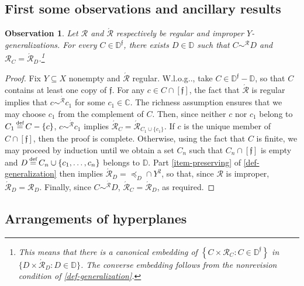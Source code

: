 \documentclass[ecta,nameyear,draft]{econsocart}
\makeatletter
\newcommand{\bs}{-}%
\newcommand{\mc}{\mathcal}
\newcommand\defeq{\mathrel{\overset{\makebox[0pt]{\mbox{\normalfont\tiny def}}}{=}}}%
\newcommand{\novel}{\mathfrak f}
\newcommand{\preceqb}{\mathbin{\preceq}}
\newcommand{\ext}{\mathrel{\mc R}}
\newcommand{\extb}{\mathbin{\mc R}}
\newcommand{\aext}{\mathrel{\acute{\mathrel{\mathcal R}}}}
\newcommand{\aextb}{\mathbin{\acute{\mathbin{\mathcal R}}}}
\newcommand{\mbbd}{{\mathds D}}
\newcommand{\mbbdp}{{\mathds D^{\novel}}}
\newcommand{\mbbc}{{\mathds C}}
\newcommand\Wlog{W\@.l\@.o\@.g\@ifnextchar.{}{.\@}}
\theoremstyle{plain}
\newtheorem{observation}{Observation}
\theoremstyle{remark}
\makeatother
\begin{document}
\begin{appendix}
  \subsection{First some observations and ancillary results}
  \begin{observation}\label{obs-reg-eq}%
    Let $\ext$ and $\aext$ respectively be regular and improper
    $Y$-generalizations. For every $C \in \mbbdp$, there exists $D \in \mbbd$
    such that $C \sim^{\extb} D$ and $\extb_{C} = \aextb_{D}$.\footnote{This
      means that there is a canonical embedding of $\left\{C \times \extb_{C}: C
      \in \mbbdp\right\}$ in $\{D \times \aextb_{D}: D \in \mbbd\}$. The
      converse embedding follows from the nonrevision condition of
    \cref{def-generalization}.}
  \end{observation}
  \begin{proof}\label{proof-reg-eq} Fix $Y\subseteq X$ nonempty and $\aext$
    regular.  \Wlog, take $C \in \mbbdp \bs \mbbd$, so that $C$ contains at least
    one copy of $\novel$.  For any $c \in C \cap [ \novel ]$, the fact that
    $\aext$
    is regular implies that $c \sim^{\aextb} c _ 1$ for some $c _ 1 \in \mbbc$. 
    The richness assumption ensures that we may choose $c _ 1$ from the
    complement of $C$.  Then, since neither $c$ nor
    $c_{1}$ belong to $C _ 1 \defeq C \bs \{c\}$, $c \sim^{\aextb} c_{1}$ implies
    $\aextb_{C} = \aextb _ {C _ 1 \cup \{c_{1}\}}$.  If $c$ is the unique member
    of $C \cap [ \novel ]$, then the proof is complete.  Otherwise, using the
    fact that $C$ is finite, we may proceed by induction until we obtain a set $C
    _ n$ such that $C _ n \cap [\novel ]$ is empty and $D \defeq C _ n \cup \{c _
    1 , \dots , c _ n \}$ belongs to $\mbbd$.  Part \ref{item-preserving} of
    \cref{def-generalization} then implies $\aextb _ { D} = \preceqb _ {D} \cap
    Y^{2}$, so that, since $\ext$ is improper, $\aextb_{D}=\extb_{D}$.  Finally,
    since $C \sim^{\aextb} D$, $\aextb _ {C} = \aextb_{D}$, as required.
  \end{proof}

  \subsection{Arrangements of hyperplanes}


\end{appendix}
\end{document}
